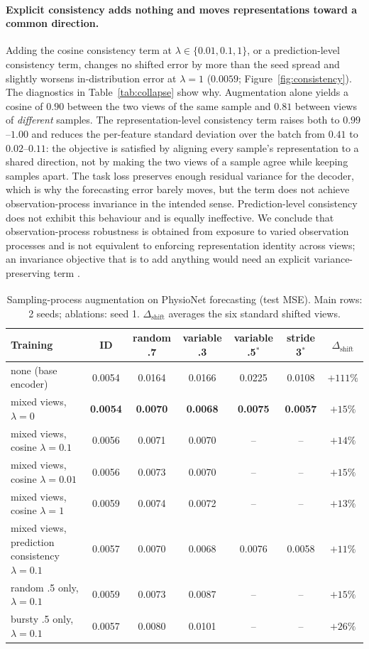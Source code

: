 \documentclass[sigconf,nonacm]{acmart}
\newcommand{\prelim}{\textsuperscript{\dag}}
\begin{document}
\paragraph{Explicit consistency adds nothing and moves representations toward a common direction.}
Adding the cosine consistency term at $\lambda\in\{0.01,0.1,1\}$, or a prediction-level consistency term, changes
no shifted error by more than the seed spread and slightly worsens in-distribution error at $\lambda=1$
($0.0059$; Figure~\ref{fig:consistency}). The diagnostics in Table~\ref{tab:collapse} show why. Augmentation alone
yields a cosine of $0.90$ between the two views of the same sample and $0.81$ between views of \emph{different}
samples. The representation-level consistency term raises both to $0.99$--$1.00$ and reduces the per-feature
standard deviation over the batch from $0.41$ to $0.02$--$0.11$: the objective is satisfied by aligning every
sample's representation to a shared direction, not by making the two views of a sample agree while keeping
samples apart. The task loss preserves enough residual variance for the decoder, which is why the forecasting
error barely moves, but the term does not achieve observation-process invariance in the intended sense.
Prediction-level consistency does not exhibit this behaviour and is equally ineffective. We conclude that
observation-process robustness is obtained from exposure to varied observation processes and is not equivalent
to enforcing representation identity across views; an invariance objective that is to add anything would need
an explicit variance-preserving term \cite{bardes2022vicreg}.

\begin{table}[t]
\caption{Sampling-process augmentation on PhysioNet forecasting (test MSE\prelim). Main rows: 2 seeds; ablations:
seed 1. $\Delta_{\mathrm{shift}}$ averages the six standard shifted views.}
\label{tab:aug}
\small
\begin{tabular}{lcccccc}
\toprule
Training & ID & random .7 & variable .3 & variable .5$^*$ & stride 3$^*$ & $\Delta_{\mathrm{shift}}$ \\
\midrule
none (base encoder) & 0.0054 & 0.0164 & 0.0166 & 0.0225 & 0.0108 & $+111\%$ \\
mixed views, $\lambda=0$ & \textbf{0.0054} & \textbf{0.0070} & \textbf{0.0068} & \textbf{0.0075} & \textbf{0.0057} & $+15\%$ \\
mixed views, cosine $\lambda=0.1$ & 0.0056 & 0.0071 & 0.0070 & -- & -- & $+14\%$ \\
\midrule
mixed views, cosine $\lambda=0.01$ & 0.0056 & 0.0073 & 0.0070 & -- & -- & $+15\%$ \\
mixed views, cosine $\lambda=1$ & 0.0059 & 0.0074 & 0.0072 & -- & -- & $+13\%$ \\
mixed views, prediction consistency $\lambda=0.1$ & 0.0057 & 0.0070 & 0.0068 & 0.0076 & 0.0058 & $+11\%$ \\
random .5 only, $\lambda=0.1$ & 0.0059 & 0.0073 & 0.0087 & -- & -- & $+15\%$ \\
bursty .5 only, $\lambda=0.1$ & 0.0057 & 0.0080 & 0.0101 & -- & -- & $+26\%$ \\
\bottomrule
\end{tabular}
\end{table}
\end{document}
